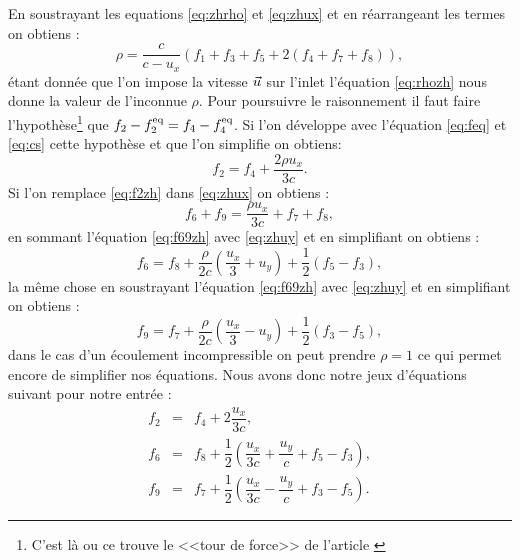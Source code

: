     En soustrayant les equations \ref{eq:zhrho} et \ref{eq:zhux} et en réarrangeant les termes on obtiens :
    \begin{equation} \label{eq:rhozh}
      \rho = \frac{c}{c - u_x}(f_1 + f_3 + f_5 + 2( f_4 + f_7 + f_8)),
    \end{equation}
    étant donnée que l'on impose la vitesse $\vec{u}$ sur l'inlet l'équation \ref{eq:rhozh} nous donne la valeur de 
    l'inconnue $\rho$. Pour poursuivre le raisonnement il faut faire l'hypothèse\footnote{C'est là ou ce trouve le 
    <<tour de force>> de l'article \cite{Zou_1997}} que $f_2 - f^{\text{eq}}_2 = f_4 - f^{\text{eq}}_4$.
    Si l'on développe avec l'équation \ref{eq:feq} et \ref{eq:cs} cette hypothèse et que l'on simplifie on obtiens:    
    \begin{equation} \label{eq:f2zh}
      f_2 = f_4 + \frac{2\rho u_x}{3c}.
    \end{equation}
    Si l'on remplace \ref{eq:f2zh} dans \ref{eq:zhux} on obtiens :
    \begin{equation} \label{eq:f69zh}
      f_6 + f_9 =  \frac{\rho u_x}{3c} + f_7 + f_8,
    \end{equation}
    en sommant l'équation \ref{eq:f69zh} avec \ref{eq:zhuy} et en simplifiant on obtiens :
    \begin{equation} \label{eq:f6zh}
      f_6 =  f_8 + \frac{\rho}{2c}\left(\frac{u_x}{3} + u_y\right) + \frac{1}{2}(f_5 - f_3),
    \end{equation}
    la même chose en soustrayant l'équation \ref{eq:f69zh} avec \ref{eq:zhuy} et en simplifiant on obtiens :
    \begin{equation} \label{eq:f6zh}
      f_9 =  f_7 + \frac{\rho}{2c}\left(\frac{u_x}{3} - u_y\right) + \frac{1}{2}(f_3 - f_5),
    \end{equation}
    dans le cas d'un écoulement incompressible on peut prendre $\rho = 1$ ce qui permet encore de simplifier nos 
    équations.  
    Nous avons donc notre jeux d'équations suivant pour notre entrée :
    \begin{equation} \label{eq:vinlet}  
      \begin{array}{rcl}
        f_2 &=& f_4 + 2\dfrac{u_x}{3c},\\
        f_6 &=&  f_8 + \dfrac{1}{2}\left(\dfrac{u_x}{3c} + \dfrac{u_y}{c} + f_5 - f_3\right),\\
        f_9 &=&  f_7 + \dfrac{1}{2}\left(\dfrac{u_x}{3c} - \dfrac{u_y}{c} + f_3 - f_5\right).
      \end{array}
    \end{equation}
    
